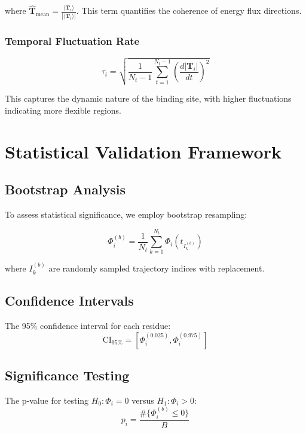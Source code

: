 \documentclass{article}
\begin{document}
where $\hat{\mathbf{T}}_{\text{mean}} = \frac{\langle\mathbf{T}_i\rangle}{|\langle\mathbf{T}_i\rangle|}$. This term quantifies the coherence of energy flux directions.

\subsubsection{Temporal Fluctuation Rate}
\begin{equation}
\tau_i = \sqrt{\frac{1}{N_t-1} \sum_{t=1}^{N_t-1} \left(\frac{d|\mathbf{T}_i|}{dt}\right)^2}
\end{equation}

This captures the dynamic nature of the binding site, with higher fluctuations indicating more flexible regions.

\section{Statistical Validation Framework}

\subsection{Bootstrap Analysis}

To assess statistical significance, we employ bootstrap resampling:

\begin{equation}
\Phi_i^{(b)} = \frac{1}{N_t} \sum_{k=1}^{N_t} \Phi_i(t_{I_k^{(b)}})
\end{equation}

where $I_k^{(b)}$ are randomly sampled trajectory indices with replacement.

\subsection{Confidence Intervals}

The 95\% confidence interval for each residue:
\begin{equation}
\text{CI}_{95\%} = \left[\Phi_i^{(0.025)}, \Phi_i^{(0.975)}\right]
\end{equation}

\subsection{Significance Testing}

The p-value for testing $H_0: \Phi_i = 0$ versus $H_1: \Phi_i > 0$:
\begin{equation}
p_i = \frac{\#\{\Phi_i^{(b)} \leq 0\}}{B}
\end{equation}
\end{document}
